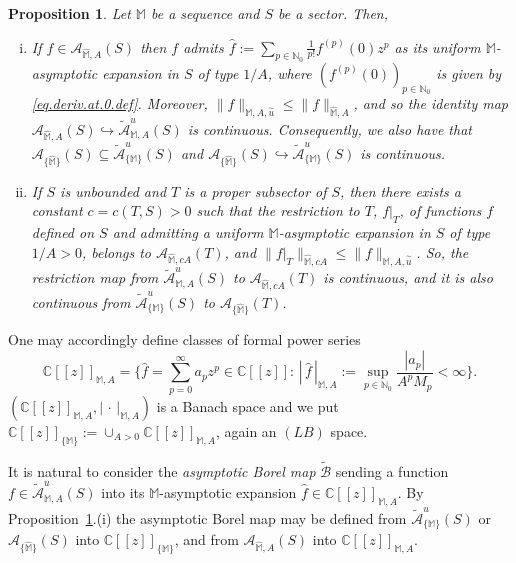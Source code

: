 \documentclass[11pt,a4paper]{article}
\theoremstyle{plain}
\newtheorem{prop}[theo]{Proposition}
\theoremstyle{definition}
\newcommand{\N}{\mathbb{N}}
\newcommand{\C}{\mathbb{C}}
\newcommand{\M}{\mathbb{M}}
\newcommand{\hM}{\widehat{\M}}
\begin{document}
\begin{prop}\label{propcotaderidesaasin}
Let $\M$ be a sequence and $S$ be a sector. Then,
\begin{enumerate}[(i)]
\item If $f\in\mathcal{A}_{\hM,A}(S)$ then $f$ admits $\widehat{f}:=\sum_{p\in\N_0}\frac{1}{p!}f^{(p)}(0)z^p$ as its uniform $\M$-asymptotic expansion in $S$ of type $1/A$, where $(f^{(p)}(0))_{p\in\N_0}$ is given by \eqref{eq.deriv.at.0.def}. Moreover, $\|f\|_{\M,A,\overset{\sim}{u}}\le \|f\|_{\hM,A}$, and so the identity map $\mathcal{A}_{\hM,A}(S)\hookrightarrow \widetilde{\mathcal{A}}^u_{\M,A}(S)$ is continuous. Consequently, we also have that
$\mathcal{A}_{\{\hM\}}(S)\subseteq \widetilde{\mathcal{A}}^u_{\{\M\}}(S)$
and $\mathcal{A}_{\{\hM\}}(S)\hookrightarrow \widetilde{\mathcal{A}}^u_{\{\M\}}(S)$ is continuous.

\item If $S$ is unbounded and $T$ is a proper subsector of $S$, then there exists a constant $c=c(T,S)>0$ such that the restriction to $T$, $f|_T$, of functions $f$ defined on $S$ and admitting a uniform $\M$-asymptotic expansion in $S$ of type $1/A>0$, belongs to $\mathcal{A}_{\hM,cA}(T)$, and $\|f|_T\|_{\hM,cA}\le \|f\|_{\M,A,\overset{\sim}{u}}$. So, the restriction map from $\widetilde{\mathcal{A}}^u_{\M,A}(S)$ to $\mathcal{A}_{\hM,cA}(T)$ is continuous, and it is also continuous from $\widetilde{\mathcal{A}}^u_{\{\M\}}(S)$ to $\mathcal{A}_{\{\hM\}}(T)$.
\end{enumerate}
\end{prop}

One may accordingly define classes of formal power series
\begin{equation}\label{eq.defBanachFormalPowerSeries}
\C[[z]]_{\M,A}=\Big\{\widehat{f}=\sum_{p=0}^\infty a_pz^p\in\C[[z]]:\, \left|\,\widehat{f} \,\right|_{\M,A}:=\sup_{p\in\N_{0}}\displaystyle \frac{|a_{p}|}{A^{p}M_{p}}<\infty\Big\}.
\end{equation}%
$(\C[[z]]_{\M,A},\left| \,\cdot\,  \right|_{\M,A})$ is a Banach space and we put $\C[[z]]_{\{\M\}}:=\cup_{A>0}\C[[z]]_{\M,A}$, again an $(LB)$ space.

It is natural to consider the \emph{asymptotic Borel map}  $\widetilde{\mathcal{B}}$
sending a function $f\in\widetilde{\mathcal{A}}^u_{\M,A}(S)$
into its $\M$-asymptotic expansion $\widehat{f}\in\C[[z]]_{\M,A}$.
By Proposition~\ref{propcotaderidesaasin}.(i)
the asymptotic Borel map may be defined from $\widetilde{\mathcal{A}}^u_{\{\M\}}(S)$ or $\mathcal{A}_{\{\hM\}}(S)$ into  $\C[[z]]_{\{\M\}}$, and from $\mathcal{A}_{\hM,A}(S)$ into $\C[[z]]_{\M,A}$.
\end{document}
